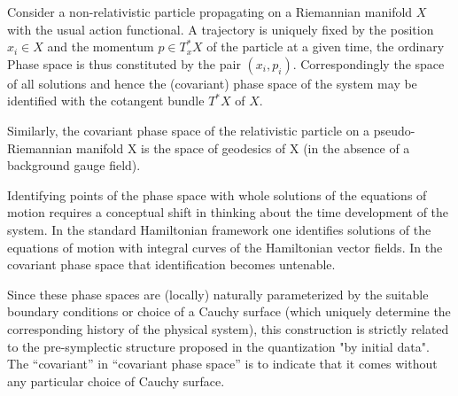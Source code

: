 \documentclass[Main]{subfiles}
\begin{document}
		\begin{example}
			Consider a non-relativistic particle propagating on a Riemannian manifold $X$ with the usual action functional.
			A trajectory is uniquely fixed by the position $x_i \in X$ and the momentum $p\in T^*_x X$ of the particle at a given time, the ordinary Phase space is thus constituted by the pair $(x_i, p_i)$.
			Correspondingly the space of all solutions and hence the (covariant) phase space of the system may be identified with the cotangent bundle $T^*X$ of $X$.
			
			Similarly, the covariant phase space of the relativistic particle on a pseudo-Riemannian manifold X is the space of geodesics of X (in the absence of a background gauge field).
		\end{example}
		Identifying points of the phase space with whole solutions of the equations of motion requires a conceptual shift in thinking about the time development of the system.
		In the standard Hamiltonian framework one identifies solutions of the equations of motion with integral curves of the Hamiltonian vector fields. In the covariant phase space that identification becomes untenable.


		Since these phase spaces are (locally) naturally parameterized by the suitable boundary conditions or choice of a Cauchy surface (which uniquely determine the corresponding history of the physical system), 
		this construction is strictly related to the pre-symplectic structure proposed in the quantization "by initial data".
		The “covariant” in “covariant phase space” is to indicate that it comes without any particular choice of Cauchy surface.
\end{document}
